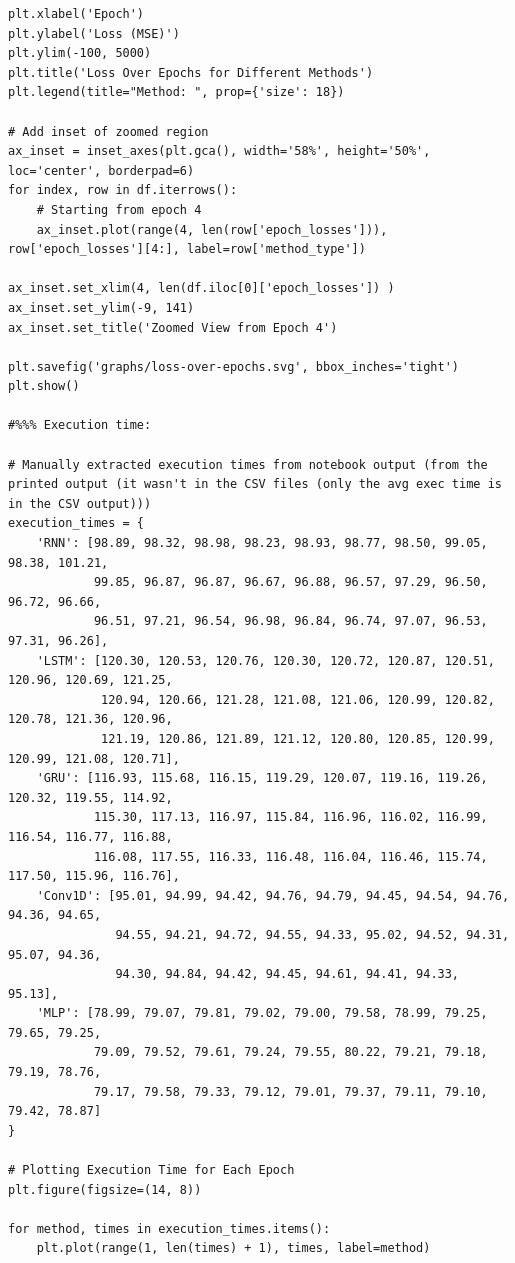 \documentclass[journal,onecolumn]{IEEEtran}
\begin{document}
{\begin{appendices}
\begin{verbatim}
plt.xlabel('Epoch')
plt.ylabel('Loss (MSE)')
plt.ylim(-100, 5000)
plt.title('Loss Over Epochs for Different Methods')
plt.legend(title="Method: ", prop={'size': 18})

# Add inset of zoomed region
ax_inset = inset_axes(plt.gca(), width='58%', height='50%', loc='center', borderpad=6)
for index, row in df.iterrows():
    # Starting from epoch 4
    ax_inset.plot(range(4, len(row['epoch_losses'])), row['epoch_losses'][4:], label=row['method_type'])

ax_inset.set_xlim(4, len(df.iloc[0]['epoch_losses']) )
ax_inset.set_ylim(-9, 141)
ax_inset.set_title('Zoomed View from Epoch 4')

plt.savefig('graphs/loss-over-epochs.svg', bbox_inches='tight')
plt.show()

#%%% Execution time:

# Manually extracted execution times from notebook output (from the printed output (it wasn't in the CSV files (only the avg exec time is in the CSV output)))
execution_times = {
    'RNN': [98.89, 98.32, 98.98, 98.23, 98.93, 98.77, 98.50, 99.05, 98.38, 101.21,
            99.85, 96.87, 96.87, 96.67, 96.88, 96.57, 97.29, 96.50, 96.72, 96.66,
            96.51, 97.21, 96.54, 96.98, 96.84, 96.74, 97.07, 96.53, 97.31, 96.26],
    'LSTM': [120.30, 120.53, 120.76, 120.30, 120.72, 120.87, 120.51, 120.96, 120.69, 121.25,
             120.94, 120.66, 121.28, 121.08, 121.06, 120.99, 120.82, 120.78, 121.36, 120.96,
             121.19, 120.86, 121.89, 121.12, 120.80, 120.85, 120.99, 120.99, 121.08, 120.71],    
    'GRU': [116.93, 115.68, 116.15, 119.29, 120.07, 119.16, 119.26, 120.32, 119.55, 114.92,
            115.30, 117.13, 116.97, 115.84, 116.96, 116.02, 116.99, 116.54, 116.77, 116.88,
            116.08, 117.55, 116.33, 116.48, 116.04, 116.46, 115.74, 117.50, 115.96, 116.76],
    'Conv1D': [95.01, 94.99, 94.42, 94.76, 94.79, 94.45, 94.54, 94.76, 94.36, 94.65,
               94.55, 94.21, 94.72, 94.55, 94.33, 95.02, 94.52, 94.31, 95.07, 94.36,
               94.30, 94.84, 94.42, 94.45, 94.61, 94.41, 94.33, 95.13],
    'MLP': [78.99, 79.07, 79.81, 79.02, 79.00, 79.58, 78.99, 79.25, 79.65, 79.25,
            79.09, 79.52, 79.61, 79.24, 79.55, 80.22, 79.21, 79.18, 79.19, 78.76,
            79.17, 79.58, 79.33, 79.12, 79.01, 79.37, 79.11, 79.10, 79.42, 78.87]
}

# Plotting Execution Time for Each Epoch
plt.figure(figsize=(14, 8))

for method, times in execution_times.items():
    plt.plot(range(1, len(times) + 1), times, label=method)


\end{verbatim}
\end{appendices}}
\end{document}
